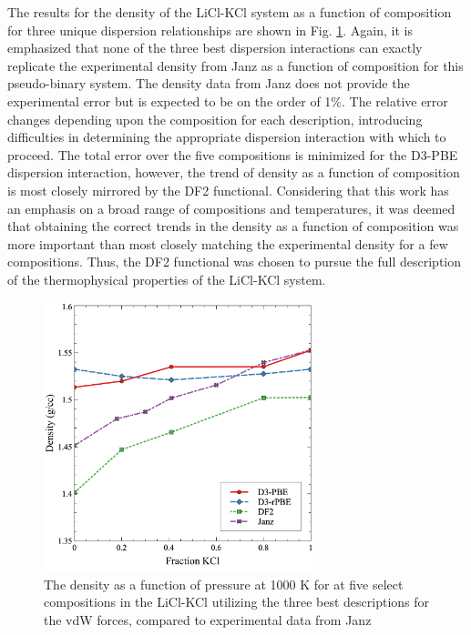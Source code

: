 \documentclass[review]{elsarticle}
\begin{document}
The results for the density of the LiCl-KCl system as a function of composition for three unique dispersion relationships are shown in Fig. \ref{fig:disp_tot}. Again, it is emphasized that none of the three best dispersion interactions can exactly replicate the experimental density from Janz as a function of composition for this pseudo-binary system. The density data from Janz does not provide the experimental error but is expected to be on the order of 1\%. The relative error changes depending upon the composition for each description, introducing difficulties in determining the appropriate dispersion interaction with which to proceed. The total error over the five compositions is minimized for the D3-PBE dispersion interaction, however, the trend of density as a function of composition is most closely mirrored by the DF2 functional. Considering that this work has an emphasis on a broad range of compositions and temperatures, it was deemed that obtaining the correct trends in the density as a function of composition was more important than most closely matching the experimental density for a few compositions. Thus, the DF2 functional was chosen to pursue the full description of the thermophysical properties of the LiCl-KCl system. 

\begin{figure}[h]
 \centering
 \includegraphics[width=0.7\textwidth]{images/final_disp.jpg} 
 \caption{The density as a function of pressure at 1000 K for at five select compositions in the LiCl-KCl utilizing the three best descriptions for the vdW forces, compared to experimental data from Janz \cite{janz1975molten,van1955electrical}}
 \label{fig:disp_tot}
\end{figure} 
\end{document}
